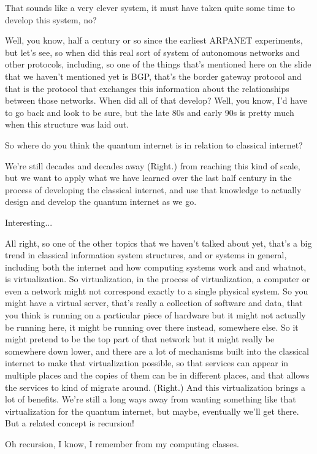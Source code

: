 That sounds like a very clever system, it must have taken quite some time to develop this system, no?

Well, you know, half a century or so since the earliest ARPANET experiments, but let's see, so when did this real sort of system of autonomous networks and other protocols, including, so one of the things that's mentioned here on the slide that we haven't mentioned yet is BGP, that's the border gateway protocol and that is the protocol that exchanges this information about the relationships between those networks. When did all of that develop? Well, you know, I'd have to go back and look to be sure, but the late 80s and early 90s is pretty much when this structure was laid out.

So where do you think the quantum internet is in relation to classical internet?

We're still decades and decades away (Right.) from reaching this kind of scale, but we want to apply what we have learned over the last half century in the process of developing the classical internet, and use that knowledge to actually design and develop the quantum internet as we go.

Interesting...

All right, so one of the other topics that we haven't talked about yet, that's a big trend in classical information system structures, and or systems in general, including both the internet and how computing systems work and and whatnot, is virtualization. So virtualization, in the process of virtualization, a computer or even a network might not correspond exactly to a single physical system. So you might have a virtual server, that's really a collection of software and data, that you think is running on a particular piece of hardware but it might not actually be running here, it might be running over there instead, somewhere else. So it might pretend to be the top part of that network but it might really be somewhere down lower, and there are a lot of mechanisms built into the classical internet to make that virtualization possible, so that services can appear in multiple places and the copies of them can be in different places, and that allows the services to kind of migrate around. (Right.) And this virtualization brings a lot of benefits. We're still a long ways away from wanting something like that virtualization for the quantum internet, but maybe, eventually we'll get there. But a related concept is recursion!

Oh recursion, I know, I remember from my computing classes.

